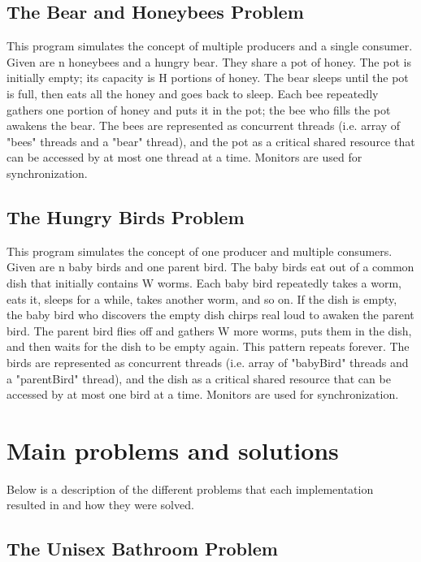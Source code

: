 \documentclass{article}
\begin{document}
\subsection{The Bear and Honeybees Problem}

This program simulates the concept of multiple producers and a single consumer. Given are n honeybees and a hungry bear. They share a pot of honey. The pot is initially empty; its capacity is H portions of honey. The bear sleeps until the pot is full, then eats all the honey and goes back to sleep. Each bee repeatedly gathers one portion of honey and puts it in the pot; the bee who fills the pot awakens the bear. The bees are represented as concurrent threads (i.e. array of "bees" threads and a "bear" thread), and the pot as a critical shared resource that can be accessed by at most one thread at a time. Monitors are used for synchronization.

\subsection{The Hungry Birds Problem}

This program simulates the concept of one producer and multiple consumers. Given are n baby birds and one parent bird. The baby birds eat out of a common dish that initially contains W worms. Each baby bird repeatedly takes a worm, eats it, sleeps for a while, takes another worm, and so on. If the dish is empty, the baby bird who discovers the empty dish chirps real loud to awaken the parent bird. The parent bird flies off and gathers W more worms, puts them in the dish, and then waits for the dish to be empty again. This pattern repeats forever. The birds are represented as concurrent threads (i.e. array of "babyBird" threads and a "parentBird" thread), and the dish as a critical shared resource that can be accessed by at most one bird at a time. Monitors are used for synchronization.

\section{Main problems and solutions}

Below is a description of the different problems that each implementation resulted in and how they were solved. 

\subsection{The Unisex Bathroom Problem}
\end{document}
